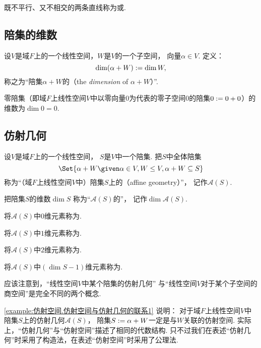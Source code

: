 既不平行、又不相交的两条直线称为或.

\subsection{陪集的维数}
\begin{definition}
设\(V\)是域\(F\)上的一个线性空间，\(W\)是\(V\)的一个子空间，
向量\(\alpha \in V\).
定义：\begin{equation}
	\dim(\alpha + W)
	:=
	\dim W,
\end{equation}
称之为“陪集\(\alpha + W\)的（the \emph{dimension} of \(\alpha + W\)）”.
\end{definition}

\begin{example}
零陪集（即域\(F\)上线性空间\(V\)中以零向量\(0\)为代表的零子空间\(0\)的陪集\(0 := 0+0\)）的
维数为\(\dim 0 = 0\).
\end{example}

\subsection{仿射几何}
\begin{definition}
设\(V\)是域\(F\)上的一个线性空间，
\(S\)是\(V\)中一个陪集.
把\(S\)中全体陪集\begin{equation*}
	\Set{
		\alpha + W
		\given
		\alpha \in V,
		W \AlgebraSubstructure V,
		\alpha + W \subseteq S
	}
\end{equation*}
称为“（域\(F\)上线性空间\(V\)中）陪集\(S\)上的（affine geometry）”，
记作\(\mathcal{A}(S)\).

把陪集\(S\)的维数\(\dim S\)
称为“\(\mathcal{A}(S)\)的”，
记作\(\dim\mathcal{A}(S)\).

将\(\mathcal{A}(S)\)中\(0\)维元素称为.

将\(\mathcal{A}(S)\)中\(1\)维元素称为.

将\(\mathcal{A}(S)\)中\(2\)维元素称为.

将\(\mathcal{A}(S)\)中\((\dim S-1)\)维元素称为.
\end{definition}
\begin{remark}
应该注意到，“线性空间\(V\)中某个陪集的仿射几何”
与“线性空间\(V\)对于某个子空间的商空间”是完全不同的两个概念.
\end{remark}
\begin{remark}
\cref{example:仿射空间.仿射空间与仿射几何的联系1} 说明：
对于域\(F\)上线性空间\(V\)中陪集\(S\)上的仿射几何\(\mathcal{A}(S)\)，
陪集\(S := \alpha + W\)一定是与\(W\)关联的仿射空间.
实际上，“仿射几何”与“仿射空间”描述了相同的代数结构.
只不过我们在表述“仿射几何”时采用了构造法，在表述“仿射空间”时采用了公理法.
\end{remark}

